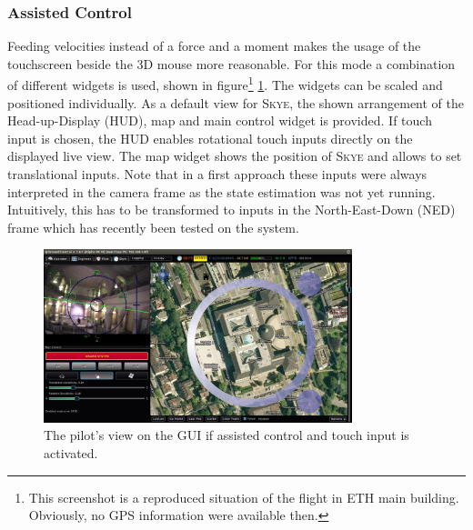 \subsubsection{Assisted Control}
Feeding velocities instead of a force and a moment makes the usage of the touchscreen beside the 3D mouse more reasonable. For this mode a combination of different widgets is used, shown in figure\footnote{This screenshot is a reproduced situation of the flight in ETH main building. Obviously, no GPS information were available then.} \ref{fig:qgc_manual_control}. The widgets can be scaled and positioned individually. As a default view for \textsc{Skye}, the shown arrangement of the Head-up-Display (HUD), map and main control widget is provided. If touch input is chosen, the HUD enables rotational touch inputs directly on the displayed live view. The map widget shows the position of \textsc{Skye} and allows to set translational inputs. Note that in a first approach these inputs were always interpreted in the camera frame as the state estimation was not yet running. Intuitively, this has to be transformed to inputs in the North-East-Down (NED) frame which has recently been tested on the system.

\begin{figure}[H] %
	\begin{center}
		\includegraphics[width=0.8\textwidth]{qgc_manual_control}
		\caption{The pilot's view on the GUI if assisted  control and touch input is activated.}  
		\label{fig:qgc_manual_control}		
	\end{center}
\end{figure}

